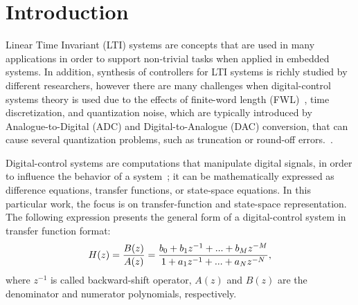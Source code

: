 \section{Introduction}



Linear Time Invariant (LTI) systems are concepts that are used in many applications in order to support non-trivial tasks when applied in embedded systems. In addition, synthesis of controllers for LTI systems is richly studied by different researchers, however there are many challenges when digital-control systems theory is used due to the effects of finite-word length (FWL)~\cite{Guang2013, Istepanian2001}, time discretization, and quantization noise, which are typically introduced by Analogue-to-Digital (ADC) and Digital-to-Analogue (DAC) conversion, that can cause several quantization problems, such as truncation or round-off errors.~\cite{astrom1997computer}. 

Digital-control systems are computations that manipulate digital signals, in order to influence the behavior of a system~\cite{Ogata2001}; it can be mathematically expressed as difference equations, transfer functions, or state-space equations. In this particular work, the focus is on transfer-function and state-space representation. The following expression presents the general form of a digital-control system in transfer function format:
%
\begin{equation}
\small
\label{eq:transferfunction}
H(z)=\frac{B(z)}{A(z)}=\frac{b_{0}+b_{1}z^{-1}+...+b_{M}z^{-M}}{1+a_{1}z^{-1}+...+a_{N}z^{-N}},
\end{equation}
%
where $z^{-1}$ is called backward-shift operator, $A(z)$ and $B(z)$ are the denominator and numerator polynomials, respectively.

